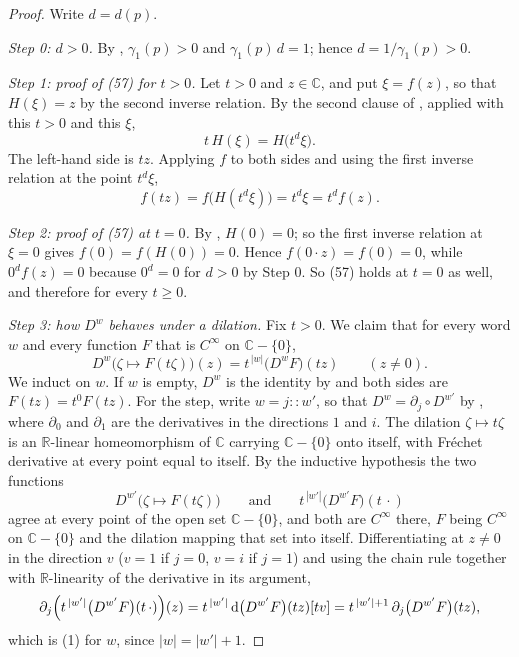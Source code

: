 \begin{proof}
Write $d=d(p)$.

\emph{Step 0: $d>0$.}  By , $\gamma_1(p)>0$ and
$\gamma_1(p)\,d=1$; hence $d=1/\gamma_1(p)>0$.

\emph{Step 1: proof of (57) for $t>0$.}  Let $t>0$ and $z\in\mathbb{C}$, and
put $\xi=f(z)$, so that $H(\xi)=z$ by the second inverse relation.  By the
second clause of , applied with this $t>0$ and this
$\xi$,
\[
  t\,H(\xi)=H\bigl(t^{d}\xi\bigr).
\]
The left-hand side is $tz$.  Applying $f$ to both sides and using the first
inverse relation at the point $t^{d}\xi$,
\[
  f(tz)=f\bigl(H(t^{d}\xi)\bigr)=t^{d}\xi=t^{d}f(z).
\]

\emph{Step 2: proof of (57) at $t=0$.}  By , $H(0)=0$; so
the first inverse relation at $\xi=0$ gives $f(0)=f(H(0))=0$.  Hence
$f(0\cdot z)=f(0)=0$, while $0^{d}f(z)=0$ because $0^{d}=0$ for $d>0$ by
Step 0.  So (57) holds at $t=0$ as well, and therefore for every $t\ge0$.

\emph{Step 3: how $D^{w}$ behaves under a dilation.}  Fix $t>0$.  We claim that
for every word $w$ and every function $F$ that is $C^\infty$ on
$\mathbb{C}-\{0\}$,
\begin{equation}\tag{1}
  D^{w}\bigl(\zeta\mapsto F(t\zeta)\bigr)(z)
  =t^{\,|w|}\bigl(D^{w}F\bigr)(tz)\qquad(z\neq0).
\end{equation}
We induct on $w$.  If $w$ is empty, $D^{w}$ is the identity by
 and both sides are $F(tz)=t^{0}F(tz)$.  For the step,
write $w=j\!:\!\!:w'$, so that $D^{w}=\partial_j\circ D^{w'}$ by
, where $\partial_0$ and $\partial_1$ are the derivatives
in the directions $1$ and $i$.  The dilation $\zeta\mapsto t\zeta$ is an
$\mathbb{R}$-linear homeomorphism of $\mathbb{C}$ carrying $\mathbb{C}-\{0\}$
onto itself, with Fréchet derivative at every point equal to itself.  By the
inductive hypothesis the two functions
\[
  D^{w'}\bigl(\zeta\mapsto F(t\zeta)\bigr)
  \qquad\text{and}\qquad
  t^{\,|w'|}\bigl(D^{w'}F\bigr)(t\,\cdot)
\]
agree at every point of the open set $\mathbb{C}-\{0\}$, and both are
$C^\infty$ there, $F$ being $C^\infty$ on $\mathbb{C}-\{0\}$ and the dilation
mapping that set into itself.  Differentiating at $z\neq0$ in the direction
$v$ ($v=1$ if $j=0$, $v=i$ if $j=1$) and using the chain rule together with
$\mathbb{R}$-linearity of the derivative in its argument,
\[
  \partial_j\Bigl(t^{\,|w'|}\bigl(D^{w'}F\bigr)(t\,\cdot)\Bigr)(z)
  =t^{\,|w'|}\,\mathrm{d}\bigl(D^{w'}F\bigr)(tz)[t v]
  =t^{\,|w'|+1}\,\partial_j\bigl(D^{w'}F\bigr)(tz),
\]
which is (1) for $w$, since $|w|=|w'|+1$.


\end{proof}
